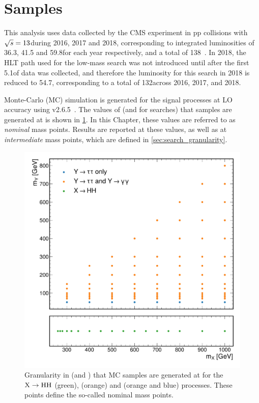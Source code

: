 \section{Samples}\label{sec:ggtt_samples}

This analysis uses data collected by the CMS experiment in pp collisions with $\sqrt{s}=13$\TeV during 2016, 2017 and 2018, corresponding to integrated luminosities of 36.3, 41.5 and 59.8\fbinv for each year respectively, and a total of 138\fbinv~\cite{CMS:2021xjt,CMS-PAS-LUM-17-004,CMS-PAS-LUM-18-002}. In 2018, the HLT path used for the low-mass \XYggHtt search was not introduced until after the first 5.1\fbinv of data was collected, and therefore the luminosity for this search in 2018 is reduced to 54.7\fbinv, corresponding to a total of 132\fbinv across 2016, 2017, and 2018.

Monte-Carlo (MC) simulation is generated for the signal processes at LO accuracy using \MGvATNLO v2.6.5~\cite{MadGraph}. The values of \mX (and \mY for \XYH searches) that samples are generated at is shown in \cref{fig:ggtt_sample_granularity}. In this Chapter, these values are referred to as \textit{nominal} mass points. Results are reported at these values, as well as at \textit{intermediate} mass points, which are defined in \cref{sec:search_granularity}.

\begin{figure}
  \centering
  \includegraphics[width=\textwidth]{Figures/Dihiggs/NMSSM_grid.pdf}
  \caption[Nominal Mass Point Granularity]{Granularity in \mX (and \mY) that MC samples are generated at for the $\mathrm{X} \to \mathrm{H}\mathrm{H}$ (green), \XYggHtt (orange) and \XYttHgg (orange and blue) processes. These points define the so-called nominal mass points.}\label{fig:ggtt_sample_granularity}
\end{figure}

